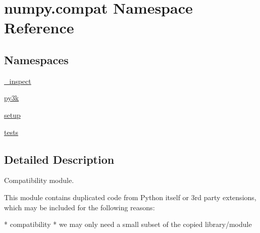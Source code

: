 \hypertarget{namespacenumpy_1_1compat}{}\section{numpy.\+compat Namespace Reference}
\label{namespacenumpy_1_1compat}
\subsection*{Namespaces}
\begin{DoxyCompactItemize}
\item 
 \hyperlink{namespacenumpy_1_1compat_1_1__inspect}{\+\_\+inspect}
\item 
 \hyperlink{namespacenumpy_1_1compat_1_1py3k}{py3k}
\item 
 \hyperlink{namespacenumpy_1_1compat_1_1setup}{setup}
\item 
 \hyperlink{namespacenumpy_1_1compat_1_1tests}{tests}
\end{DoxyCompactItemize}


\subsection{Detailed Description}
\begin{DoxyVerb}Compatibility module.

This module contains duplicated code from Python itself or 3rd party
extensions, which may be included for the following reasons:

  * compatibility
  * we may only need a small subset of the copied library/module\end{DoxyVerb}
 